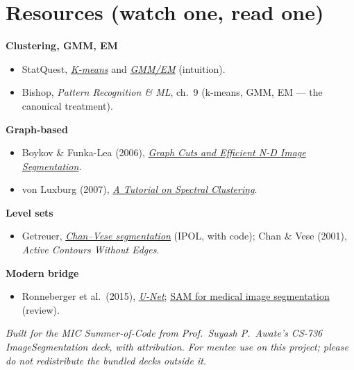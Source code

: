\documentclass[11pt]{article}
\begin{document}
\section*{Resources (watch one, read one)}

\textbf{Clustering, GMM, EM}
\begin{itemize}[nosep,leftmargin=*]
  \item StatQuest, \href{https://www.youtube.com/watch?v=4b5d3muPQmA}{\emph{K-means}} and \href{https://www.youtube.com/watch?v=REypj2sy_5U}{\emph{GMM/EM}} (intuition).
  \item Bishop, \emph{Pattern Recognition \& ML}, ch.~9 (k-means, GMM, EM --- the canonical treatment).
\end{itemize}

\textbf{Graph-based}
\begin{itemize}[nosep,leftmargin=*]
  \item Boykov \& Funka-Lea (2006), \href{https://link.springer.com/article/10.1007/s11263-006-7934-5}{\emph{Graph Cuts and Efficient N-D Image Segmentation}}.
  \item von Luxburg (2007), \href{https://arxiv.org/abs/0711.0189}{\emph{A Tutorial on Spectral Clustering}}.
\end{itemize}

\textbf{Level sets}
\begin{itemize}[nosep,leftmargin=*]
  \item Getreuer, \href{https://www.ipol.im/pub/art/2012/g-cv/}{\emph{Chan--Vese segmentation}} (IPOL, with code); Chan \& Vese (2001), \emph{Active Contours Without Edges}.
\end{itemize}

\textbf{Modern bridge}
\begin{itemize}[nosep,leftmargin=*]
  \item Ronneberger et al.\ (2015), \href{https://arxiv.org/abs/1505.04597}{\emph{U-Net}}; \href{https://www.mdpi.com/2306-5354/12/12/1312}{SAM for medical image segmentation} (review).
\end{itemize}

\vfill
\begin{center}\small\itshape
Built for the MIC Summer-of-Code from Prof.\ Suyash P.\ Awate's CS-736
ImageSegmentation deck, with attribution. For mentee use on this project; please
do not redistribute the bundled decks outside it.
\end{center}
\end{document}
